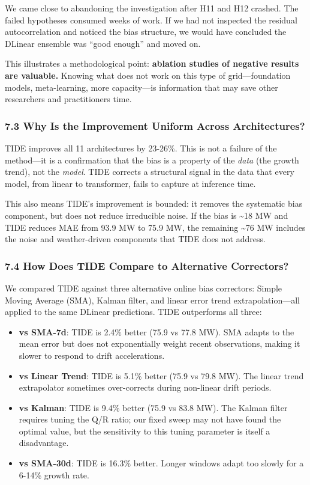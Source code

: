 We came close to abandoning the investigation after H11 and H12 crashed.
The failed hypotheses consumed weeks of work. If we had not inspected
the residual autocorrelation and noticed the bias structure, we would
have concluded the DLinear ensemble was ``good enough'' and moved on.

This illustrates a methodological point: \textbf{ablation studies of
negative results are valuable.} Knowing what does not work on this type
of grid---foundation models, meta-learning, more capacity---is
information that may save other researchers and practitioners time.

\subsubsection{7.3 Why Is the Improvement Uniform Across
Architectures?}\label{why-is-the-improvement-uniform-across-architectures}

TIDE improves all 11 architectures by 23-26\%. This is not a failure of
the method---it is a confirmation that the bias is a property of the
\emph{data} (the growth trend), not the \emph{model}. TIDE corrects a
structural signal in the data that every model, from linear to
transformer, fails to capture at inference time.

This also means TIDE's improvement is bounded: it removes the systematic
bias component, but does not reduce irreducible noise. If the bias is
\textasciitilde18 MW and TIDE reduces MAE from 93.9 MW to 75.9 MW, the
remaining \textasciitilde76 MW includes the noise and weather-driven
components that TIDE does not address.

\subsubsection{7.4 How Does TIDE Compare to Alternative
Correctors?}\label{how-does-tide-compare-to-alternative-correctors}

We compared TIDE against three alternative online bias correctors:
Simple Moving Average (SMA), Kalman filter, and linear error trend
extrapolation---all applied to the same DLinear predictions. TIDE
outperforms all three:

\begin{itemize}
\tightlist
\item
  \textbf{vs SMA-7d}: TIDE is 2.4\% better (75.9 vs 77.8 MW). SMA adapts
  to the mean error but does not exponentially weight recent
  observations, making it slower to respond to drift accelerations.
\item
  \textbf{vs Linear Trend}: TIDE is 5.1\% better (75.9 vs 79.8 MW). The
  linear trend extrapolator sometimes over-corrects during non-linear
  drift periods.
\item
  \textbf{vs Kalman}: TIDE is 9.4\% better (75.9 vs 83.8 MW). The Kalman
  filter requires tuning the Q/R ratio; our fixed sweep may not have
  found the optimal value, but the sensitivity to this tuning parameter
  is itself a disadvantage.
\item
  \textbf{vs SMA-30d}: TIDE is 16.3\% better. Longer windows adapt too
  slowly for a 6-14\% growth rate.
\end{itemize}

